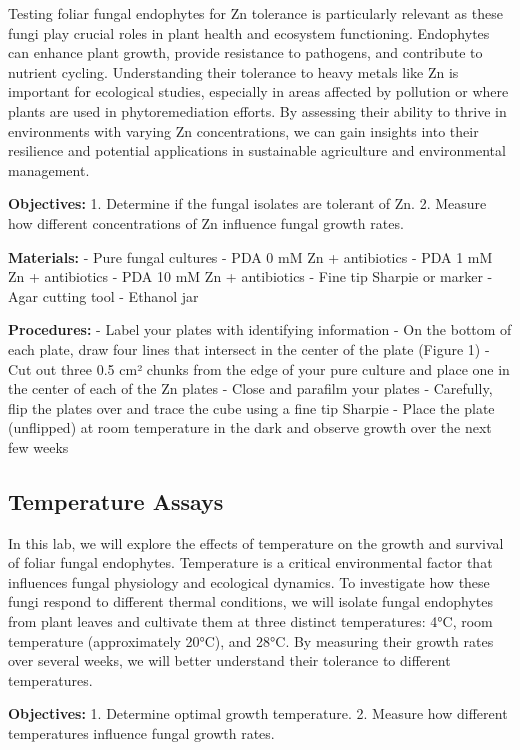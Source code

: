 \documentclass[
  letterpaper,
  DIV=11,
  numbers=noendperiod]{scrreprt}
\begin{document}
Testing foliar fungal endophytes for Zn tolerance is particularly
relevant as these fungi play crucial roles in plant health and ecosystem
functioning. Endophytes can enhance plant growth, provide resistance to
pathogens, and contribute to nutrient cycling. Understanding their
tolerance to heavy metals like Zn is important for ecological studies,
especially in areas affected by pollution or where plants are used in
phytoremediation efforts. By assessing their ability to thrive in
environments with varying Zn concentrations, we can gain insights into
their resilience and potential applications in sustainable agriculture
and environmental management.

\textbf{Objectives:} 1. Determine if the fungal isolates are tolerant of
Zn. 2. Measure how different concentrations of Zn influence fungal
growth rates.

\textbf{Materials:} - Pure fungal cultures - PDA 0 mM Zn + antibiotics -
PDA 1 mM Zn + antibiotics - PDA 10 mM Zn + antibiotics - Fine tip
Sharpie or marker - Agar cutting tool - Ethanol jar

\textbf{Procedures:} - Label your plates with identifying information -
On the bottom of each plate, draw four lines that intersect in the
center of the plate (Figure 1) - Cut out three 0.5 cm² chunks from the
edge of your pure culture and place one in the center of each of the Zn
plates - Close and parafilm your plates - Carefully, flip the plates
over and trace the cube using a fine tip Sharpie - Place the plate
(unflipped) at room temperature in the dark and observe growth over the
next few weeks

\subsection*{Temperature Assays}\label{temperature-assays}

In this lab, we will explore the effects of temperature on the growth
and survival of foliar fungal endophytes. Temperature is a critical
environmental factor that influences fungal physiology and ecological
dynamics. To investigate how these fungi respond to different thermal
conditions, we will isolate fungal endophytes from plant leaves and
cultivate them at three distinct temperatures: 4°C, room temperature
(approximately 20°C), and 28°C. By measuring their growth rates over
several weeks, we will better understand their tolerance to different
temperatures.

\textbf{Objectives:} 1. Determine optimal growth temperature. 2. Measure
how different temperatures influence fungal growth rates.
\end{document}
